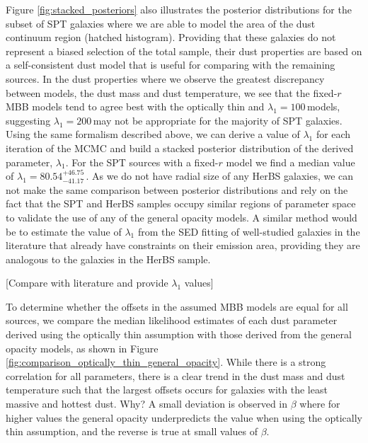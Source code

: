 Figure \ref{fig:stacked_posteriors} also illustrates the posterior distributions for the subset of SPT galaxies where we are able to model the area of the dust continuum region (hatched histogram). Providing that these galaxies do not represent a biased selection of the total sample, their dust properties are based on a self-consistent dust model that is useful for comparing with the remaining sources. In the dust properties where we observe the greatest discrepancy between models, the dust mass and dust temperature, we see that the fixed-$r$ MBB models tend to agree best with the optically thin and $\lambda_1 = 100$\,\micron models, suggesting $\lambda_1 = 200$\,\micron may not be appropriate for the majority of SPT galaxies. Using the same formalism described above, we can derive a value of $\lambda_1$ for each iteration of the MCMC and build a stacked posterior distribution of the derived parameter, $\lambda_1$. For the SPT sources with a fixed-$r$ model we find a median value of $\lambda_1 = 80.54_{-41.17}^{+46.75}$\,\micron. As we do not have radial size of any HerBS galaxies, we can not make the same comparison between posterior distributions and rely on the fact that the SPT and HerBS samples occupy similar regions of parameter space to validate the use of any of the general opacity models. A similar method would be to estimate the value of $\lambda_1$ from the SED fitting of well-studied galaxies in the literature that already have constraints on their emission area, providing they are analogous to the galaxies in the HerBS sample. 

{\color{red} [Compare with literature and provide $\lambda_1$ values]}

To determine whether the offsets in the assumed MBB models are equal for all sources, we compare the median likelihood estimates of each dust parameter derived using the optically thin assumption with those derived from the general opacity models, as shown in Figure \ref{fig:comparison_optically_thin_general_opacity}. While there is a strong correlation for all parameters, there is a clear trend in the dust mass and dust temperature such that the largest offsets occurs for galaxies with the least massive and hottest dust. {\color{red} Why?} A small deviation is observed in $\beta$ where for higher values the general opacity underpredicts the value when using the optically thin assumption, and the reverse is true at small values of $\beta$.

